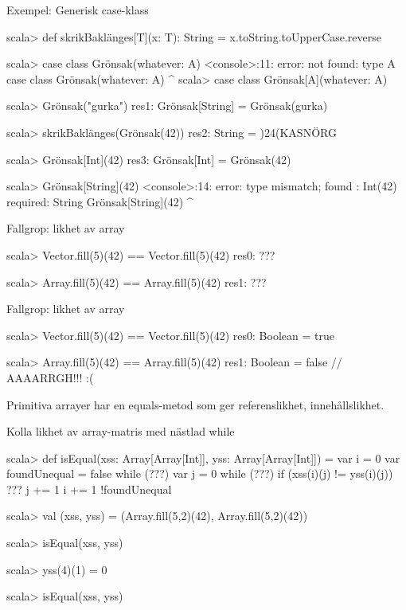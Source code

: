 \begin{Slide}{Exempel: Generisk case-klass}
\vspace{-0.5em}\begin{REPL}
scala> def skrikBaklänges[T](x: T): String = x.toString.toUpperCase.reverse

scala> case class Grönsak(whatever: A)
<console>:11: error: not found: type A
       case class Grönsak(whatever: A)
                                    ^
scala> case class Grönsak[A](whatever: A)

scala> Grönsak("gurka")
res1: Grönsak[String] = Grönsak(gurka)

scala> skrikBaklänges(Grönsak(42))
res2: String = )24(KASNÖRG

scala> Grönsak[Int](42)
res3: Grönsak[Int] = Grönsak(42)

scala> Grönsak[String](42)
<console>:14: error: type mismatch;
 found   : Int(42)
 required: String
       Grönsak[String](42)
                       ^
\end{REPL}
\end{Slide}


\ifkompendium\else
\begin{Slide}{Fallgrop: likhet av array}
\begin{REPL}
scala> Vector.fill(5)(42) == Vector.fill(5)(42)
res0: ???

scala> Array.fill(5)(42) == Array.fill(5)(42)
res1: ???
\end{REPL}
\end{Slide}
\fi

\begin{Slide}{Fallgrop: likhet av array}
\begin{REPL}
scala> Vector.fill(5)(42) == Vector.fill(5)(42)
res0: Boolean = true

scala> Array.fill(5)(42) == Array.fill(5)(42)
res1: Boolean = false  // AAAARRGH!!! :(
\end{REPL}
Primitiva arrayer har en equals-metod som ger referenslikhet,  innehållslikhet.
\end{Slide}

\ifkompendium\else
\begin{Slide}{Kolla likhet av array-matris med nästlad while}
\begin{REPL}
scala> def isEqual(xss: Array[Array[Int]], yss: Array[Array[Int]]) = {
         var i = 0
         var foundUnequal = false
         while (???) {
           var j = 0
           while (???) {
             if (xss(i)(j) != yss(i)(j)) ???
             j += 1
           }
           i += 1
         }
         !foundUnequal
       }

scala> val (xss, yss) = (Array.fill(5,2)(42), Array.fill(5,2)(42))

scala> isEqual(xss, yss)

scala> yss(4)(1) = 0

scala> isEqual(xss, yss)
\end{REPL}
\end{Slide}
\fi


